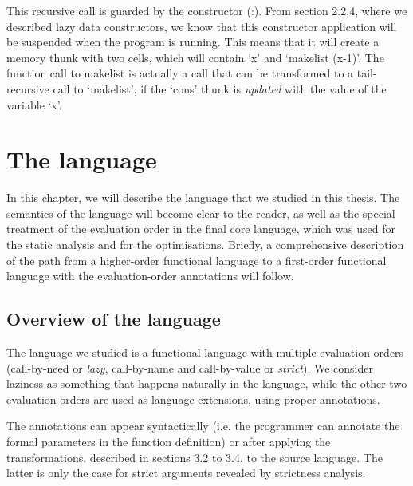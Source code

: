 \documentclass[diploma]{softlab-thesis}
\begin{document}
This recursive call is guarded by the constructor (:).
From section 2.2.4, where we described lazy data constructors,
we know that this constructor application will be suspended when 
the program is running. This means that it will create a memory 
thunk with two cells, which will contain `x' and `makelist (x-1)'.
The function call to makelist is actually a call that can be transformed 
to a tail-recursive call to `makelist', if the `cons' thunk is \textit{updated} 
with the value of the variable `x'. 





\chapter {The language} 
In this chapter, we will describe the language that we studied in this thesis.
The semantics of the language will become clear to the reader, as well as 
the special treatment of the evaluation order in the final core 
language, which was used for the static analysis and for the optimisations. Briefly, a 
comprehensive description of the path from a higher-order functional language 
to a first-order functional language with the evaluation-order annotations will follow.

\section {Overview of the language }

The language we studied is a functional language 
with multiple evaluation orders (call-by-need or 
\textit{lazy}, call-by-name and call-by-value or \textit{strict}).
We consider laziness as something that happens naturally in the language, while 
the other two evaluation orders are used as language extensions,
using proper annotations.

The annotations can appear syntactically (i.e. the programmer can annotate 
the formal parameters in the function definition) or 
after applying the transformations, described in sections 3.2 to 3.4, 
to the source language. The latter
is only the case for strict arguments revealed by strictness analysis.
\end{document}

